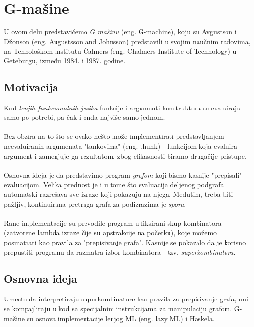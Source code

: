 \section{G-mašine}
\label{sec:Gmašine}

U ovom delu predstavićemo {\em G mašinu} (eng. G-machine), koju su Avgustson i Džonson (eng. Augustsson and Johnsson) predstavili u svojim naučnim radovima, na Tehnološkom institutu Čalmers (eng. Chalmers Institute of Technology) u Geteburgu, između 1984. i 1987. godine. 

\subsection{Motivacija}
Kod {\em lenjih funkcionalnih jezika} funkcije i argumenti konstruktora se evaluiraju samo po potrebi, pa čak i onda najviše samo jednom. \\
\\Bez obzira na to što se ovako nešto može implementirati predstavljanjem neevaluiranih argumenata "tankovima" (eng. thunk) - funkcijom koja evaluira argument i zamenjuje ga rezultatom, zbog efikasnosti biramo drugačije pristupe. \\ \\Osnovna ideja je da predstavimo program {\em grafom} koji bismo kasnije "prepisali"  evaluacijom. Velika prednost je i u tome što evaluacija deljenog podgrafa automatski razrešava sve izraze koji pokazuju na njega. Međutim, treba biti pažljiv, kontinuirana pretraga grafa za podizrazima je {\em spora}. \\\\
Rane implementacije su prevodile program u fiksirani skup kombinatora (zatvorene lambda izraze čije su apstrakcije na početku), koje možemo posmatrati kao pravila za "prepisivanje grafa". Kasnije se pokazalo da je korisno prepustiti programu da razmatra izbor kombinatora - tzv. {\em superkombinatora}. \\ %


\subsection{Osnovna ideja} 
Umesto da interpretiraju superkombinatore kao pravila za prepisivanje grafa, oni se kompajliraju u kod sa specijalnim instrukcijama za manipulaciju grafom. G-mašine su osnova implementacije lenjog ML (eng. lazy ML) i Haskela.\\ 

